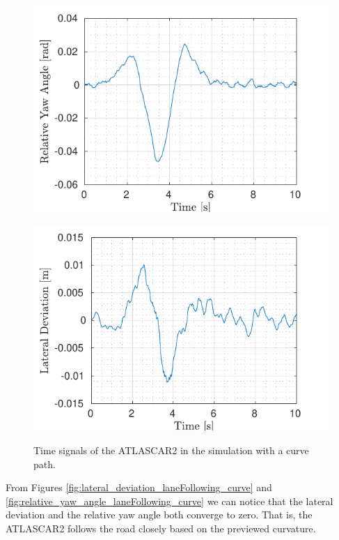 \begin{figure}[!h]
\begin{minipage}[t]{0.49\textwidth}
		\includegraphics[width=\textwidth]{../../MATLAB/lane_following_curve/figure/RelativeYawAngleVsTime_curve.pdf}
		\label{fig:relative_yaw_angle_laneFollowing_curve}
	\end{minipage}
	\begin{minipage}[t]{0.49\textwidth}
		\includegraphics[width=\textwidth]{../../MATLAB/lane_following_curve/figure/LateralDeviationVsTime_curve.pdf}
		\label{fig:lateral_deviation_laneFollowing_curve}
	\end{minipage}
	\caption{Time signals of the ATLASCAR2 in the simulation with a curve path.}
	\label{fig:laneFollowing_signals_curve}
\end{figure}
From Figures \ref{fig:lateral_deviation_laneFollowing_curve} and \ref{fig:relative_yaw_angle_laneFollowing_curve} we can notice that the lateral deviation and the relative yaw angle both converge to zero. That is, the ATLASCAR2 follows the road closely based on the previewed curvature.
